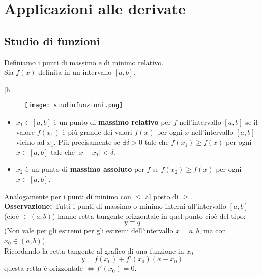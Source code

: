\documentclass[../../main.tex]{subfiles}
\begin{document}
\section{Applicazioni alle derivate}
\subsection{Studio di funzioni}
Definiamo i punti di massimo e di minimo relativo.\\
Sia $f(x)$ definita in un intervallo $[a, b]$.\\
\begin{center}[h]
    \begin{figure}
        \texttt{[image: studiofunzioni.png]}
    \end{figure}
\end{center}

\begin{itemize}
    \item $x_1\in[a, b]$ è un punto di \textbf{massimo relativo} per $f$ nell'intervallo $[a, b]$ se il valore $f(x_1)$ è più grande dei valori
          $f(x)$ per ogni $x$ nell'intervallo $[a, b]$ vicino ad $x_1$. Più precisamente se $\exists \delta > 0$
          tale che $f(x_1) \geq f(x)$ per ogni $x\in[a, b]$ tale che $|x-x_1|<\delta$.
    \item $x_2$ è un punto di \textbf{massimo assoluto} per $f$ se $f(x_2)\geq f(x)$ per ogni $x\in[a, b]$.
\end{itemize}
Analogamente per i punti di minimo con $\leq$ al posto di $\geq$.\\
\textbf{Osservazione:} Tutti i punti di massimo o minimo interni all'intervallo $[a, b]$ (cioè $\in(a, b)$) hanno retta tangente orizzontale in quel punto cioè del tipo:
\[
    y = q
\]
(Non vale per gli estremi per gli estremi dell'intervallo $x=a,b$, ma con $x_0\in(a, b)$).\\
Ricordando la retta tangente al grafico di una funzione in $x_0$
\[
    y = f(x_0) + f'(x_0)(x-x_0)
\]
questa retta è orizzontale $\iff f'(x_0) = 0$.\\
\end{document}
